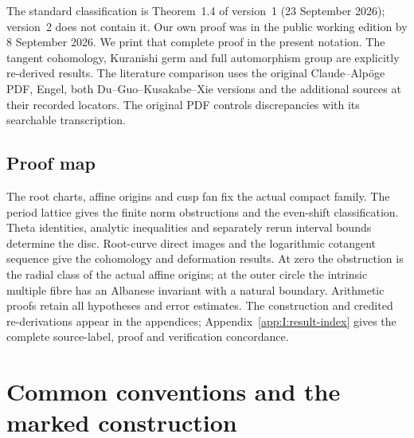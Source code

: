 The standard classification is Theorem~1.4 of version~1
(23 September 2026); version~2 does not contain it. Our own proof was in the
public working edition by 8 September 2026. We print that complete proof
in the present notation. The tangent cohomology, Kuranishi germ and full
automorphism group are explicitly re-derived results.
The literature comparison uses the original Claude--Alp\"oge PDF, Engel,
both Du--Guo--Kusakabe--Xie versions and the additional sources at their
recorded locators. The original PDF controls discrepancies with its
searchable transcription.

\enlargethispage{\baselineskip}
\subsection{Proof map}
The root charts, affine origins and cusp fan fix the actual compact family.
The period lattice gives the finite norm obstructions and the even-shift
classification. Theta identities, analytic inequalities and separately
rerun interval bounds determine the disc. Root-curve direct images and the
logarithmic cotangent sequence give the cohomology and deformation results.
At zero the obstruction is the radial class of the actual affine origins;
at the outer circle the intrinsic multiple fibre has an Albanese invariant
with a natural boundary. Arithmetic proofs retain all hypotheses and error
estimates. The construction and credited re-derivations appear in the
appendices; Appendix~\ref{app:I:result-index} gives the complete source-label,
proof and verification concordance.

\clearpage
\section{Common conventions and the marked construction}
\label{def:common-conventions}
